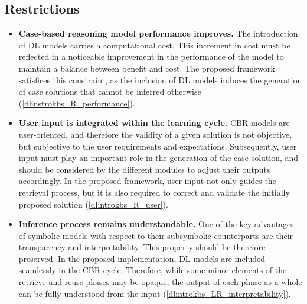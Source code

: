 \subsection{Restrictions}
\begin{itemize}
    \item \textbf{Case-based reasoning model performance improves.} The introduction of DL models carries a computational cost. This increment in cost must be reflected in a noticeable improvement in the performance of the model to maintain a balance between benefit and cost. The proposed framework satisfices this constraint, as the inclusion of DL models induces the generation of case solutions that cannot be inferred otherwise (\ref{dlinstrokbs_R_performance}).
    
    \item \textbf{User input is integrated within the learning cycle.} CBR models are user-oriented, and therefore the validity of a given solution is not objective, but subjective to the user requirements and expectations. Subsequently, user input must play an important role in the generation of the case solution, and should be considered by the different modules to adjust their outputs accordingly. In the proposed framework, user input not only guides the retrieval process, but it is also required to correct and validate the initially proposed solution (\ref{dlintrokbs_R_user}). 
    
    \item \textbf{Inference process remains understandable.} One of the key advantages of symbolic models with respect to their subsymbolic counterparts are their transparency and interpretability. This property should be therefore preserved. In the proposed implementation, DL models are included seamlessly in the CBR cycle. Therefore, while some minor elements of the retrieve and reuse phases may be opaque, the output of each phase as a whole can be fully understood from the input (\ref{dlintrokbs_LR_interpretability}).
\end{itemize}
